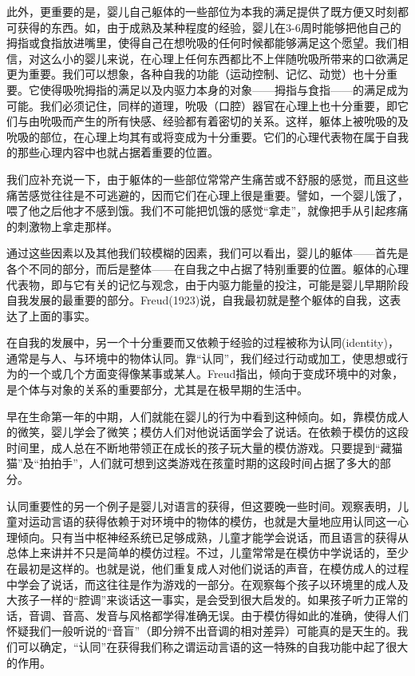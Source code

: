 \documentclass[UTF8,10pt,a4paper,openany]{book}
\begin{document}
此外，更重要的是，婴儿自己躯体的一些部位为本我的满足提供了既方便又时刻都可获得的东西。如，由于成熟及某种程度的经验，婴儿在3-6周时能够把他自己的拇指或食指放进嘴里，使得自己在想吮吸的任何时候都能够满足这个愿望。我们相信，对这么小的婴儿来说，在心理上任何东西都比不上伴随吮吸所带来的口欲满足更为重要。我们可以想象，各种自我的功能（运动控制、记忆、动觉）也十分重要。它使得吸吮拇指的满足以及内驱力本身的对象——拇指与食指——的满足成为可能。我们必须记住，同样的道理，吮吸（口腔）器官在心理上也十分重要，即它们与由吮吸而产生的所有快感、经验都有着密切的关系。这样，躯体上被吮吸的及吮吸的部位，在心理上均其有或将变成为十分重要。它们的心理代表物在属于自我的那些心理内容中也就占据着重要的位置。

我们应补充说一下，由于躯体的一些部位常常产生痛苦或不舒服的感觉，而且这些痛苦感觉往往是不可逃避的，因而它们在心理上很是重要。譬如，一个婴儿饿了，喂了他之后他才不感到饿。我们不可能把饥饿的感觉“拿走”，就像把手从引起疼痛的刺激物上拿走那样。

通过这些因素以及其他我们较模糊的因素，我们可以看出，婴儿的躯体——首先是各个不同的部分，而后是整体——在自我之中占据了特别重要的位置。躯体的心理代表物，即与它有关的记忆与观念，由于内驱力能量的投注，可能是婴儿早期阶段自我发展的最重要的部分。Freud(1923)说，自我最初就是整个躯体的自我，这表达了上面的事实。

在自我的发展中，另一个十分重要而又依赖于经验的过程被称为认同(identity)，通常是与人、与环境中的物体认同。靠“认同”，我们经过行动或加工，使思想或行为的一个或几个方面变得像某事或某人。Freud指出，倾向于变成环境中的对象，是个体与对象的关系的重要部分，尤其是在极早期的生活中。

早在生命第一年的中期，人们就能在婴儿的行为中看到这种倾向。如，靠模仿成人的微笑，婴儿学会了微笑；模仿人们对他说话面学会了说话。在依赖于模仿的这段时间里，成人总在不断地带领正在成长的孩子玩大量的模仿游戏。只要提到“藏猫猫”及“拍拍手”，人们就可想到这类游戏在孩童时期的这段时间占据了多大的部分。

认同重要性的另一个例子是婴儿对语言的获得，但这要晚一些时间。观察表明，儿童对运动言语的获得依赖于对环境中的物体的模仿，也就是大量地应用认同这一心理倾向。只有当中枢神经系统已足够成熟，儿童才能学会说话，而且语言的获得从总体上来讲并不只是简单的模仿过程。不过，儿童常常是在模仿中学说话的，至少在最初是这样的。也就是说，他们重复成人对他们说话的声音，在模仿成人的过程中学会了说话，而这往往是作为游戏的一部分。在观察每个孩子以环境里的成人及大孩子一样的“腔调”来谈话这一事实，是会受到很大启发的。如果孩子听力正常的话，音调、音高、发音与风格都学得准确无误。由于模仿得如此的准确，使得人们怀疑我们一般听说的“音盲”（即分辨不出音调的相对差异）可能真的是天生的。我们可以确定，“认同”在获得我们称之谓运动言语的这一特殊的自我功能中起了很大的作用。
\end{document}

